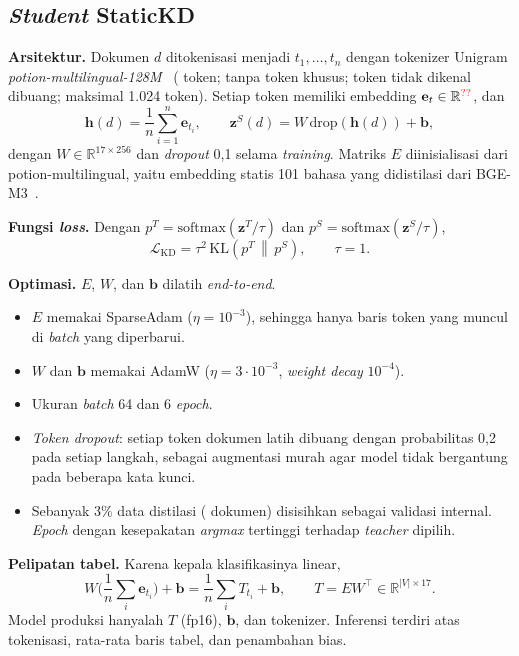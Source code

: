 \documentclass[journal]{IEEEtran}
\newcommand{\eng}[1]{\textit{#1}}   %
\begin{document}
\subsection{\eng{Student} StaticKD}
\textbf{Arsitektur.} Dokumen $d$ ditokenisasi menjadi $t_1,\dots,t_n$ dengan tokenizer Unigram \eng{potion-multilingual-128M}~\cite{tulkens2024model2vec} ( token; tanpa token khusus; token tidak dikenal dibuang; maksimal 1.024 token). Setiap token memiliki embedding $\mathbf{e}_t\in\mathbb{R}^{\val{student.dim}}$, dan
\begin{equation}
\mathbf{h}(d)=\frac{1}{n}\sum_{i=1}^{n}\mathbf{e}_{t_i},\qquad
\mathbf{z}^{S}(d)=W\,\mathrm{drop}(\mathbf{h}(d))+\mathbf{b},
\label{eq:student}
\end{equation}
dengan $W\in\mathbb{R}^{17\times 256}$ dan \eng{dropout} 0,1 selama \eng{training}. Matriks $E$ diinisialisasi dari potion-multilingual, yaitu embedding statis 101 bahasa yang didistilasi dari BGE-M3~\cite{chen2024bgem3}.

\textbf{Fungsi \eng{loss}.} Dengan $p^{T}=\mathrm{softmax}(\mathbf{z}^{T}/\tau)$ dan $p^{S}=\mathrm{softmax}(\mathbf{z}^{S}/\tau)$,
\begin{equation}
\mathcal{L}_{\mathrm{KD}}=\tau^{2}\,\mathrm{KL}\!\left(p^{T}\,\middle\|\,p^{S}\right),\qquad \tau=1 .
\label{eq:kd}
\end{equation}

\textbf{Optimasi.} $E$, $W$, dan $\mathbf{b}$ dilatih \eng{end-to-end}.
\begin{itemize}
  \item $E$ memakai SparseAdam ($\eta=10^{-3}$), sehingga hanya baris token yang muncul di \eng{batch} yang diperbarui.
  \item $W$ dan $\mathbf{b}$ memakai AdamW ($\eta=3\cdot 10^{-3}$, \eng{weight decay} $10^{-4}$).
  \item Ukuran \eng{batch} 64 dan 6 \eng{epoch}.
  \item \eng{Token dropout}: setiap token dokumen latih dibuang dengan probabilitas 0,2 pada setiap langkah, sebagai augmentasi murah agar model tidak bergantung pada beberapa kata kunci.
  \item Sebanyak 3\% data distilasi ( dokumen) disisihkan sebagai validasi internal. \eng{Epoch} dengan kesepakatan \eng{argmax} tertinggi terhadap \eng{teacher} dipilih.
\end{itemize}

\textbf{Pelipatan tabel.} Karena kepala klasifikasinya linear,
\begin{equation}
W\Big(\frac{1}{n}\sum_{i}\mathbf{e}_{t_i}\Big)+\mathbf{b}=\frac{1}{n}\sum_{i}T_{t_i}+\mathbf{b},\qquad T=EW^{\top}\in\mathbb{R}^{|V|\times 17}.
\label{eq:fold}
\end{equation}
Model produksi hanyalah $T$ (fp16), $\mathbf{b}$, dan tokenizer. Inferensi terdiri atas tokenisasi, rata-rata baris tabel, dan penambahan bias.
\end{document}

